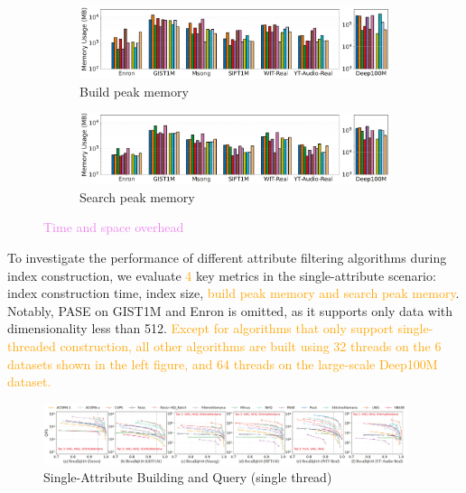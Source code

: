 \documentclass[sigconf, nonacm]{acmart}
\begin{document}
\begin{figure}[t]
\begin{subfigure}{\columnwidth}
			\includegraphics[width=0.99\linewidth]{figures/indexData/exp_7_memory_mb_comparison_query1.pdf}
			\caption{Build peak memory }
			\label{fig:build_memory_mb_comparison}
		\end{subfigure}
		
		\begin{subfigure}{\columnwidth}
			\centering
			
			\includegraphics[width=0.99\linewidth]{figures/searchMem/label_memory_comparison.pdf}
			\caption{Search peak memory}
			\label{fig:search_memory_mb_comparison}
		\end{subfigure}
		
		\caption{\textcolor{violet}{Time and space overhead}}
		\label{fig:build_index_comparison}
	\end{figure}
	
	
	
	To investigate the performance of different attribute filtering algorithms during index construction, we evaluate \textcolor{orange}{4} key metrics in the single-attribute scenario: index construction time, index size, \textcolor{orange}{build peak memory and search peak memory}. Notably, PASE on GIST1M and Enron is omitted, as it supports only data with dimensionality less than 512. \textcolor{orange}{Except for algorithms that only support single-threaded construction, all other algorithms are built using 32 threads on the 6 datasets shown in the left figure, and 64 threads on the large-scale Deep100M dataset.}
	
	
	\begin{figure}
		\centering
		
		\includegraphics[width=0.95\textwidth]{figures/exp/exp_1_1_SingleLabel_1thread.pdf}
		\caption{Single-Attribute Building and Query (single thread) }
		\label{fig:exp_1_1_SingleLabel_1thread}
	\end{figure}
	
\end{document}
